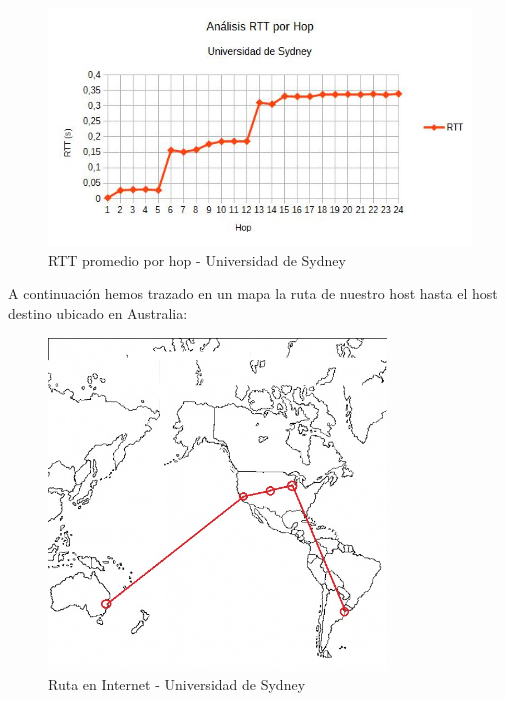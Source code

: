 \begin{figure}[H]
\centering
\includegraphics[width=1\textwidth]{graficos/rTT_Australia.jpg}
\caption{RTT promedio por hop - Universidad de Sydney}
\label{Australia_rtt}
\end{figure}

A continuación hemos trazado en un mapa la ruta de nuestro host hasta el host destino ubicado en Australia:
\begin{figure}[H]
\centering
\includegraphics[width=0.8\textwidth]{graficos/mapa_australia.jpg}
\caption{Ruta en Internet - Universidad de Sydney}
\label{australia_zs}
\end{figure}